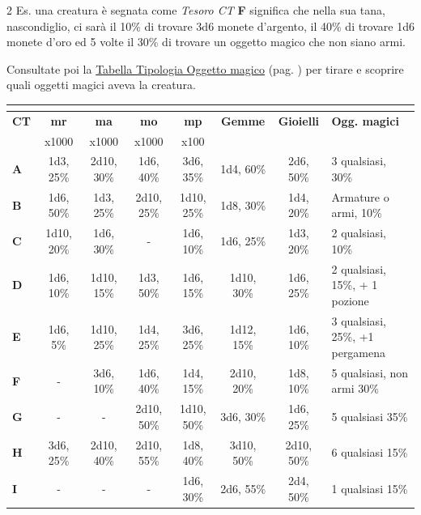 \begin{multicols}{2}
Es. una creatura è segnata come \emph{Tesoro CT} \textbf{F} significa che nella sua tana, nascondiglio, ci sarà il 10\% di trovare 3d6 monete d'argento, il 40\% di trovare 1d6 monete d'oro ed 5 volte il 30\% di trovare un oggetto magico che non siano armi.


Consultate poi la \hyperlink{tipologiaoggettomagico}{Tabella Tipologia Oggetto magico} (pag. \pageref{tipologiaoggettomagico}) per tirare e scoprire quali oggetti magici aveva la creatura.

\end{multicols}


\label{valoretesoroincontro}\hypertarget{valoretesoroincontro}{}

\medskip

\noindent\begin{tabularx}{\textwidth}{>{\bfseries}l|>{\small}c|>{\small}c|>{\small}c|>{\small}c|>{\small}c|>{\small}c|>{\small}X}
	\toprule
\rowcolor{gray!20}	\multicolumn{8}{c}{\textbf{Tesori da tana o nascondigli di creature}} \\
	\midrule
 \rowcolor{gray!20}CT & \textbf{mr} & \textbf{ma} & \textbf{mo} & \textbf{mp} & \textbf{Gemme} & \textbf{Gioielli} & \textbf{Ogg. magici} \\
	\hline
& x1000 & x1000 & x1000 & x100 & & & \\
\rowcolor{gray!20}A & 1d3, 25\% & 2d10, 30\% & 1d6, 40\% & 3d6, 35\% & 1d4, 60\% & 2d6, 50\% & 3 qualsiasi, 30\% \\
B & 1d6, 50\% & 1d3, 25\% & 2d10, 25\% & 1d10, 25\% & 1d8, 30\% & 1d4, 20\% & Armature o armi, 10\% \\
\rowcolor{gray!20}C & 1d10, 20\% & 1d6, 30\% & - & 1d6, 10\% & 1d6, 25\% & 1d3, 20\% & 2 qualsiasi, 10\% \\
D & 1d6, 10\% & 1d10, 15\% & 1d3, 50\% & 1d6, 15\% & 1d10, 30\% & 1d6, 25\% & 2 qualsiasi, 15\%, + 1 pozione\\
\rowcolor{gray!20}E & 1d6, 5\% & 1d10, 25\% & 1d4, 25\% & 3d6, 25\% & 1d12, 15\% & 1d6, 10\% & 3 qualsiasi, 25\%, +1 pergamena \\
F & - & 3d6, 10\% & 1d6, 40\% & 1d4, 15\% & 2d10, 20\% & 1d8, 10\% & 5 qualsiasi, non armi 30\% \\
\rowcolor{gray!20}G & - & - & 2d10, 50\% & 1d10, 50\% & 3d6, 30\% & 1d6, 25\% & 5 qualsiasi 35\% \\
H & 3d6, 25\% & 2d10, 40\% & 2d10, 55\% & 1d8, 40\% & 3d10, 50\% & 2d10, 50\% & 6 qualsiasi 15\% \\
\rowcolor{gray!20}I & - & - & - & 1d6, 30\% & 2d6, 55\% & 2d4, 50\% & 1 qualsiasi 15\% \\
\end{tabularx}



